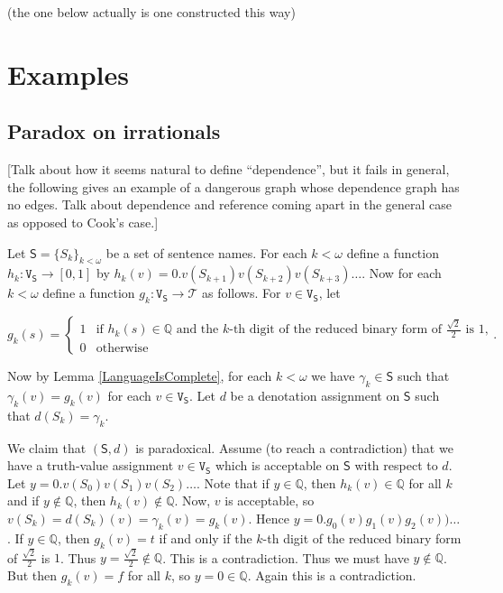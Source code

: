 \documentclass[12pt]{article}
\theoremstyle{remark}
\newcommand{\fancy}[1]{\mathcal{#1}}
\def\S{\textsf{S}}
\def\V{\texttt{V}}
\begin{document}
(the one below actually is one constructed this way)

\section{Examples}

\subsection{Paradox on irrationals}
[Talk about how it seems natural to define ``dependence'', but it fails in general, the following gives an example of a dangerous graph whose dependence graph has no edges.  Talk about dependence and reference coming apart in the general case as opposed to Cook's case.]\newline

Let $\S = \{S_k\}_{k < \omega}$ be a set of sentence names.   For each $k < \omega$ define a function $h_k:\V_\S \rightarrow [0,1]$ by $h_k(v) = 0.v(S_{k+1})v(S_{k+2})v(S_{k+3})\ldots$.  Now for each $k < \omega$ define a function $g_k:\V_\S \rightarrow \fancy{T}$ as follows. For $v \in \V_\S$, let 

\[g_k(s) = \begin{cases}
1 & \text{if } h_k(s) \in \mathbb{Q} \text{ and the $k$-th digit of the reduced binary form of $\frac{\sqrt{2}}{2}$ is $1$,}\\
0 & \text{otherwise}
\end{cases}.\]

Now by Lemma \ref{LanguageIsComplete}, for each $k < \omega$ we have $\gamma_k \in \S$ such that $\gamma_k(v) = g_k(v)$ for each $v \in \V_\S$.  Let $d$ be a denotation assignment on $\S$ such that $d(S_k) = \gamma_k$.\newline

We claim that $(\S, d)$ is paradoxical.  Assume (to reach a contradiction) that we have a truth-value assignment $v \in \V_\S$ which is acceptable on $\S$ with respect to $d$. Let $y = 0.v(S_{0})v(S_{1})v(S_{2})\ldots$. Note that if $y \in \mathbb{Q}$, then $h_k(v) \in \mathbb{Q}$ for all $k$ and if $y \not \in \mathbb{Q}$, then $h_k(v) \not \in \mathbb{Q}$.  Now, $v$ is acceptable, so $v(S_k) = d(S_k)(v) = \gamma_k(v) = g_k(v)$.  Hence $y = 0.g_0(v)g_1(v)g_2(v))\ldots$.  If $y \in \mathbb{Q}$, then $g_k(v) = t$ if and only if the $k$-th digit of the reduced binary form of $\frac{\sqrt{2}}{2}$ is $1$.  Thus $y = \frac{\sqrt{2}}{2} \not \in \mathbb{Q}$.  This is a contradiction.  Thus we must have $y \not \in \mathbb{Q}$.  But then $g_k(v) = f$ for all $k$, so $y = 0 \in \mathbb{Q}$.  Again this is a contradiction.
\end{document}

